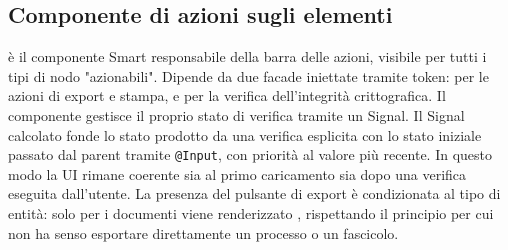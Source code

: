 \subsection{Componente di azioni sugli elementi}
 è il componente Smart responsabile della barra delle azioni, visibile per tutti i tipi di nodo "azionabili". Dipende da due facade iniettate tramite token:  per le azioni di export e stampa, e  per la verifica dell'integrità crittografica.
Il componente gestisce il proprio stato di verifica tramite un Signal. Il Signal calcolato  fonde lo stato prodotto da una verifica esplicita con lo stato iniziale passato dal parent tramite \texttt{@Input}, con priorità al valore più recente. In questo modo la UI rimane coerente sia al primo caricamento sia dopo una verifica eseguita dall'utente.
La presenza del pulsante di export è condizionata al tipo di entità: solo per i documenti viene renderizzato , rispettando il principio per cui non ha senso esportare direttamente un processo o un fascicolo.

